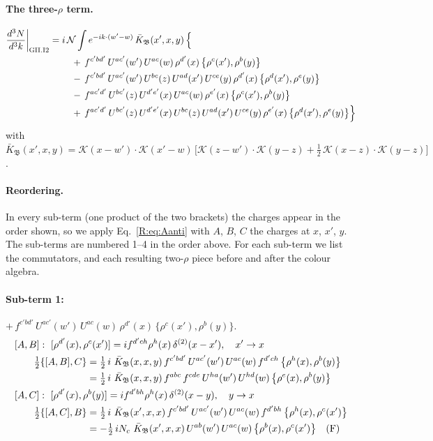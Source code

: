 \documentclass[10pt]{article}
\numberwithin{equation}{section}
\newcommand{\KK}{\mathcal K}
\newcommand{\NN}{\mathcal N}
\begin{document}
\paragraph{The three-$\rho$ term.}
\begin{align}
\frac{d^3N}{d^3k}\bigg|_{\rm GII.I2}={}&i\,\NN\int e^{-ik\cdot(w'-w)}\,\bar K_{\mathfrak B}(x',x,y)\,\Big\{\notag\\
&\quad +\,f^{c'bd'}\,U^{ac'}(w')\,U^{ac}(w)\,\rho^{d'}(x)\,\big\{\rho^{c}(x'),\rho^{b}(y)\big\}\notag\\
&\quad -\,f^{c'bd'}\,U^{ac'}(w')\,U^{bc}(z)\,U^{ad}(x')\,U^{ce}(y)\,\rho^{d'}(x)\,\big\{\rho^{d}(x'),\rho^{e}(y)\big\}\notag\\
&\quad -\,f^{ac'd'}\,U^{bc'}(z)\,U^{d'e'}(x)\,U^{ac}(w)\,\rho^{e'}(x)\,\big\{\rho^{c}(x'),\rho^{b}(y)\big\}\notag\\
&\quad +\,f^{ac'd'}\,U^{bc'}(z)\,U^{d'e'}(x)\,U^{bc}(z)\,U^{ad}(x')\,U^{ce}(y)\,\rho^{e'}(x)\,\big\{\rho^{d}(x'),\rho^{e}(y)\big\}\Big\}\label{R:eq:in-GII.I2}
\end{align}
with $\bar K_{\mathfrak B}(x',x,y)=\KK(x-w')\cdot\KK(x'-w)\,\Big[\KK(z-w')\cdot\KK(y-z)+\tfrac12\,\KK(x-z)\cdot\KK(y-z)\Big]$.
\paragraph{Reordering.} In every sub-term (one product of the two brackets) the charges appear in the order shown, so we apply Eq.~\eqref{R:eq:Aanti} with $A$, $B$, $C$ the charges at $x$, $x'$, $y$. The sub-terms are numbered 1--4 in the order above. For each sub-term we list the commutators, and each resulting two-$\rho$ piece before and after the colour algebra.
\paragraph{Sub-term 1:} $+\,f^{c'bd'}\,U^{ac'}(w')\,U^{ac}(w)\,\rho^{d'}(x)\,\big\{\rho^{c}(x'),\rho^{b}(y)\big\}$.
\begin{align}
&[A,B]:\ [\rho^{d'}(x),\rho^{c}(x')]=i f^{d'ch}\rho^{h}(x)\,\delta^{(2)}(x-x'),\quad x'\to x\notag\\
&\qquad \tfrac12\{[A,B],C\}=\tfrac12\,i\,\,\bar K_{\mathfrak B}(x,x,y)\,f^{c'bd'}\,U^{ac'}(w')\,U^{ac}(w)\,f^{d'ch}\,\big\{\rho^{h}(x),\rho^{b}(y)\big\}\notag\\
&\qquad\phantom{\tfrac12\{[A,B],C\}}=\tfrac12\,i\,\,\bar K_{\mathfrak B}(x,x,y)\,f^{abc}\,f^{cde}\,U^{ha}(w')\,U^{hd}(w)\,\big\{\rho^{e}(x),\rho^{b}(y)\big\}
\label{R:eq:GII.I2-1-AB}\\
&[A,C]:\ [\rho^{d'}(x),\rho^{b}(y)]=i f^{d'bh}\rho^{h}(x)\,\delta^{(2)}(x-y),\quad y\to x\notag\\
&\qquad \tfrac12\{[A,C],B\}=\tfrac12\,i\,\,\bar K_{\mathfrak B}(x',x,x)\,f^{c'bd'}\,U^{ac'}(w')\,U^{ac}(w)\,f^{d'bh}\,\big\{\rho^{h}(x),\rho^{c}(x')\big\}\notag\\
&\qquad\phantom{\tfrac12\{[A,C],B\}}=-\tfrac12\,i N_{c}\,\,\bar K_{\mathfrak B}(x',x,x)\,U^{ab}(w')\,U^{ac}(w)\,\big\{\rho^{b}(x),\rho^{c}(x')\big\}\quad\text{(F)}
\label{R:eq:GII.I2-1-AC}
\end{align}
\end{document}
